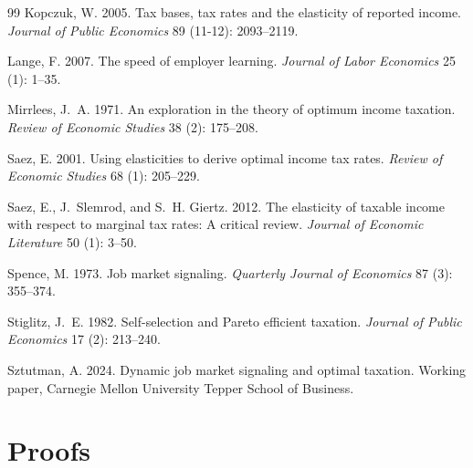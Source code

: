 \documentclass[12pt]{article}
\theoremstyle{definition}
\theoremstyle{remark}
\begin{document}
\begin{thebibliography}{99}
Kopczuk, W. 2005.
\newblock Tax bases, tax rates and the elasticity of reported income.
\newblock \emph{Journal of Public Economics} 89 (11-12): 2093--2119.

Lange, F. 2007.
\newblock The speed of employer learning.
\newblock \emph{Journal of Labor Economics} 25 (1): 1--35.

Mirrlees, J.~A. 1971.
\newblock An exploration in the theory of optimum income taxation.
\newblock \emph{Review of Economic Studies} 38 (2): 175--208.

Saez, E. 2001.
\newblock Using elasticities to derive optimal income tax rates.
\newblock \emph{Review of Economic Studies} 68 (1): 205--229.

Saez, E., J.~Slemrod, and S.~H. Giertz. 2012.
\newblock The elasticity of taxable income with respect to marginal tax rates:
  A critical review.
\newblock \emph{Journal of Economic Literature} 50 (1): 3--50.

Spence, M. 1973.
\newblock Job market signaling.
\newblock \emph{Quarterly Journal of Economics} 87 (3): 355--374.

Stiglitz, J.~E. 1982.
\newblock Self-selection and Pareto efficient taxation.
\newblock \emph{Journal of Public Economics} 17 (2): 213--240.

Sztutman, A. 2024.
\newblock Dynamic job market signaling and optimal taxation.
\newblock Working paper, Carnegie Mellon University Tepper School of Business.

\end{thebibliography}

\newpage
\appendix

\section{Proofs}
\label{app:proofs}
\end{document}
